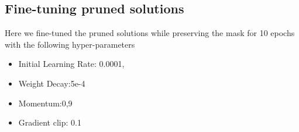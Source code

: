 %
%
%
%


\subsection*{Fine-tuning pruned solutions}
\label{subsec:Fine_tuning_solutions}
Here we fine-tuned the pruned solutions while preserving the mask for 10 epochs with the following hyper-parameters
\begin{itemize}
  \item Initial Learning Rate: 0.0001,
  \item Weight Decay:5e-4
  \item Momentum:0,9
  \item Gradient clip: 0.1
\end{itemize}

